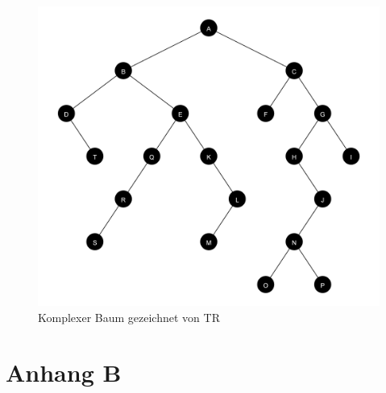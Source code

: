 \begin{figure}[ht]
    \centering
    \includegraphics[scale = 0.11]{abbildungen/komplex_a3}
    \caption{Komplexer Baum gezeichnet von \ac{TR}}
    \label{pic:komplex_a3}
\end{figure}

\chapter{Anhang B}
\label{chap:anhang_b}















